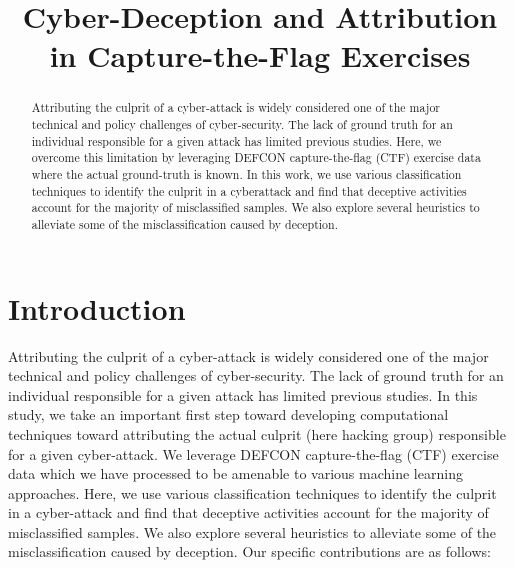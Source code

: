 \documentclass[conference]{IEEEtran}
\begin{document}
	
	\renewcommand{\thetable}{\arabic{table}}
	\renewcommand{\figurename}{Fig.}

\title{Cyber-Deception and Attribution\\ in Capture-the-Flag Exercises}

\author{
	\and
	}

\maketitle


\begin{abstract}
Attributing the culprit of a cyber-attack is widely considered one of the major technical and policy challenges of cyber-security. The lack of ground truth for an individual responsible for a given attack has limited previous studies. Here, we overcome this limitation by leveraging DEFCON capture-the-flag (CTF) exercise data where the actual ground-truth is known. In this work, we use various classification techniques to identify the culprit in a cyberattack and find that deceptive activities account for the majority of misclassified samples. We also explore several heuristics to alleviate some of the misclassification caused by deception.
\end{abstract}

\IEEEpeerreviewmaketitle

\section{Introduction}
Attributing the culprit of a cyber-attack is widely considered one of the major technical and policy challenges of cyber-security. The lack of ground truth for an individual responsible for a given attack has limited previous studies. In this study, we take an important first step toward developing computational techniques toward attributing the actual culprit (here hacking group) responsible for a given cyber-attack. We leverage DEFCON capture-the-flag (CTF) exercise data which
we have processed to be amenable to various machine learning approaches. Here, we use various classification techniques to identify the culprit in a cyber-attack and find that deceptive
activities account for the majority of misclassified samples. We also explore several heuristics to alleviate some of the misclassification caused by deception. Our specific contributions are as follows:
\end{document}
